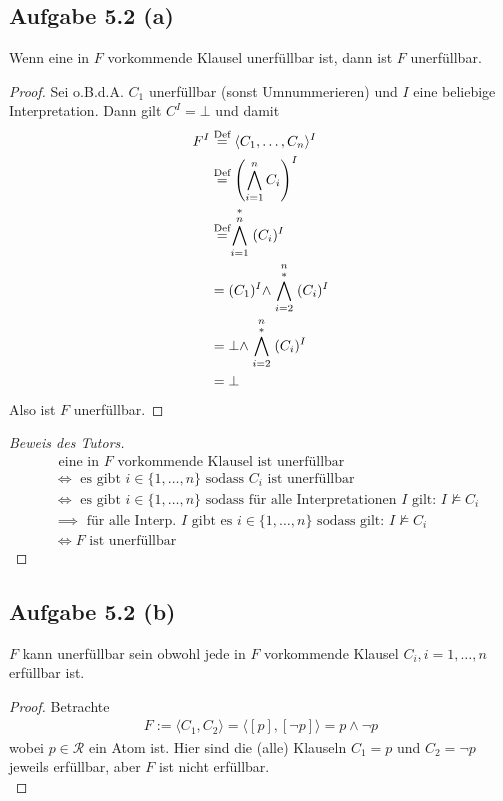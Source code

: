 \documentclass[12pt,a4paper]{article}
\newcommand{\RR}{\mathcal{R}}
\begin{document}
\subsection*{Aufgabe 5.2 (a)}
Wenn eine in $F$ vorkommende Klausel unerfüllbar ist, dann ist $F$ unerfüllbar.
\begin{proof}
Sei o.B.d.A. $C_1$ unerfüllbar (sonst Umnummerieren) und $I$ eine beliebige Interpretation. Dann gilt $C^I=\bot$ und damit
\begin{align*}
F^I
&\stackrel{\text{Def}}{=}
\langle C_1,\ldots,C_n\rangle^I\\
&\stackrel{\text{Def}}{=}
\left(\bigwedge\limits_{i=1}^n C_i\right)^I\\
&\stackrel{\text{Def}}{=}
\stackrel{\ast}{\bigwedge\limits_{i=1}^n} (C_i)^I\\
&=(C_1)^I\wedge \stackrel{n}{\bigwedge\limits_{i=2}^\ast} (C_i)^I\\
&=\bot\wedge \stackrel{n}{\bigwedge\limits_{i=2}^\ast} (C_i)^I\\
&=\bot
\end{align*}
Also ist $F$ unerfüllbar.
\end{proof}
\begin{proof}[Beweis des Tutors]
\begin{align*}
&\text{ eine in $F$ vorkommende Klausel ist unerfüllbar}\\
&\Longleftrightarrow\text{ es gibt $i\in\lbrace1,\ldots,n\rbrace$ sodass $C_i$ ist unerfüllbar}\\
&\Longleftrightarrow\text{ es gibt $i\in\lbrace1,\ldots,n\rbrace$ sodass für alle Interpretationen $I$ gilt: }I\not\models C_i\\
&\implies\text{ für alle Interp. $I$ gibt es $i\in\lbrace1,\ldots,n\rbrace$ sodass gilt: }I\not\models C_i\\
&\Longleftrightarrow F\text{ ist unerfüllbar}
\end{align*}
\end{proof}

\subsection*{Aufgabe 5.2 (b)}
$F$ kann unerfüllbar sein obwohl jede in $F$ vorkommende Klausel $C_i,i=1,\ldots,n$ erfüllbar ist.
\begin{proof}
Betrachte
\begin{align*}
F:=\langle C_1,C_2\rangle=\langle[p],[\neg p]\rangle=p\wedge\neg p
\end{align*}
wobei $p\in\RR$ ein Atom ist. Hier sind die (alle) Klauseln $C_1=p$ und $C_2=\neg p$  jeweils erfüllbar, aber $F$ ist nicht erfüllbar.\\
\end{proof}
\end{document}
